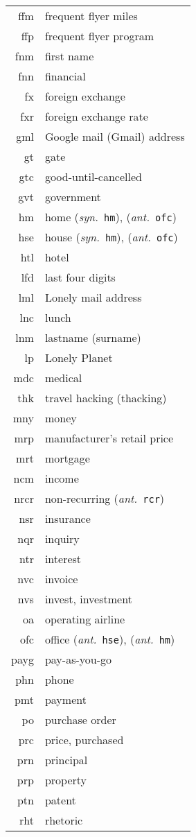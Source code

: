 \documentclass[12pt,twoside]{article}
\newcommand{\ant}[1]{(\textit{ant.}~\texttt{#1})}
\newcommand{\syn}[1]{(\textit{syn.}~\texttt{#1})}
\begin{document}
\begin{longtable}[>{\bfseries}l]{>{\ttfamily}r l}
ffm & frequent flyer miles \\
ffp & frequent flyer program \\
fnm & first name \\
fnn & financial \\
fx & foreign exchange \\
fxr & foreign exchange rate \\
gml & Google mail (Gmail) address \\
gt & gate \\
gtc & good-until-cancelled \\
gvt & government \\
hm & home \syn{hm}, \ant{ofc} \\
hse & house \syn{hm}, \ant{ofc} \\
htl & hotel \\
lfd & last four digits \\
lml & Lonely mail address \\
lnc & lunch \\
lnm & lastname (surname) \\
lp & Lonely Planet \\
mdc & medical \\
thk & travel hacking (thacking) \\
mny & money \\
mrp & manufacturer's retail price \\
mrt & mortgage \\
ncm & income \\
nrcr & non-recurring \ant{rcr} \\
nsr & insurance \\
nqr & inquiry \\
ntr & interest \\
nvc & invoice \\
nvs & invest, investment \\
oa & operating airline \\
ofc & office \ant{hse}, \ant{hm} \\
payg & pay-as-you-go \\
phn & phone \\
pmt & payment \\
po & purchase order \\
prc & price, purchased \\
prn & principal \\
prp & property \\
ptn & patent \\
rht & rhetoric \\

\end{longtable}
\end{document}

